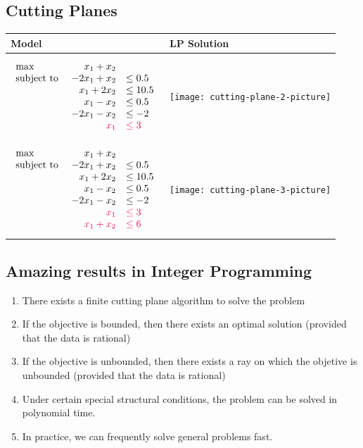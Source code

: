 \documentclass{article}
\begin{document}
\vspace{-1cm}
\subsection{Cutting Planes}
\begin{table}[H]
\centering\begin{tabular}{>{\centering\arraybackslash}m{5cm}>{\centering\arraybackslash}m{10cm}}
 \hline
\textbf{Model} & \textbf{LP Solution} \\\hline \hline
$$
\begin{array}{lrl}
\max \ & x_1 + x_2\\
\text{subject to  } &  -2x_1 + x_2 &\leq 0.5\\
& x_1 + 2x_2 &\leq 10.5\\
& x_1 - x_2 &\leq 0.5\\
& - 2x_1 - x_2 &\leq -2\\
& \tred{x_1} &\tred{\leq 3}
\end{array} 
$$
&
\texttt{[image: cutting-plane-2-picture]}\\
$$
\begin{array}{lrl}
\max \ & x_1 + x_2\\
\text{subject to  } &  -2x_1 + x_2 &\leq 0.5\\
& x_1 + 2x_2 &\leq 10.5\\
& x_1 - x_2 &\leq 0.5\\
& - 2x_1 - x_2 &\leq -2\\
& \tred{x_1} & \tred{\leq 3}\\
& \tred{x_1 + x_2} & \tred{\leq 6}
\end{array} 
$$
&
\texttt{[image: cutting-plane-3-picture]}\\
\hline
 \end{tabular}
\end{table}

\subsection{Amazing results in Integer Programming}

\begin{enumerate}
\item There exists a finite cutting plane algorithm to solve the problem
\item If the objective is bounded, then there exists an optimal solution (provided that the data is rational)
\item If the objective is unbounded, then there exists a ray on which the objetive is unbounded (provided that the data is rational)
\item Under certain special structural conditions, the problem can be solved in polynomial time.
\item In practice, we can frequently solve general problems fast.
\end{enumerate}
\end{document}
